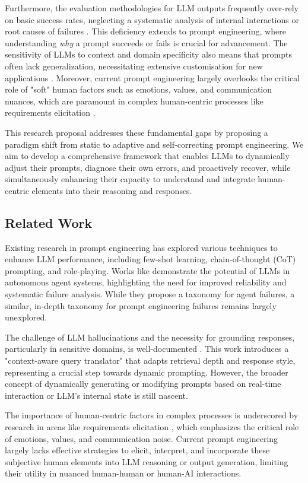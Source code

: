 \documentclass{article}
\begin{document}
Furthermore, the evaluation methodologies for LLM outputs frequently over-rely on basic success rates, neglecting a systematic analysis of internal interactions or root causes of failures \cite{paper1_agents}. This deficiency extends to prompt engineering, where understanding \textit{why} a prompt succeeds or fails is crucial for advancement. The sensitivity of LLMs to context and domain specificity also means that prompts often lack generalization, necessitating extensive customisation for new applications \cite{paper5_legalrag}. Moreover, current prompt engineering largely overlooks the critical role of "soft" human factors such as emotions, values, and communication nuances, which are paramount in complex human-centric processes like requirements elicitation \cite{paper2_requirements}.

This research proposal addresses these fundamental gaps by proposing a paradigm shift from static to adaptive and self-correcting prompt engineering. We aim to develop a comprehensive framework that enables LLMs to dynamically adjust their prompts, diagnose their own errors, and proactively recover, while simultaneously enhancing their capacity to understand and integrate human-centric elements into their reasoning and responses.

\subsection{Related Work}
Existing research in prompt engineering has explored various techniques to enhance LLM performance, including few-shot learning, chain-of-thought (CoT) prompting, and role-playing. Works like \cite{paper1_agents} demonstrate the potential of LLMs in autonomous agent systems, highlighting the need for improved reliability and systematic failure analysis. While they propose a taxonomy for agent failures, a similar, in-depth taxonomy for prompt engineering failures remains largely unexplored.

The challenge of LLM hallucinations and the necessity for grounding responses, particularly in sensitive domains, is well-documented \cite{paper5_legalrag}. This work introduces a "context-aware query translator" that adapts retrieval depth and response style, representing a crucial step towards dynamic prompting. However, the broader concept of dynamically generating or modifying prompts based on real-time interaction or LLM's internal state is still nascent.

The importance of human-centric factors in complex processes is underscored by research in areas like requirements elicitation \cite{paper2_requirements}, which emphasizes the critical role of emotions, values, and communication noise. Current prompt engineering largely lacks effective strategies to elicit, interpret, and incorporate these subjective human elements into LLM reasoning or output generation, limiting their utility in nuanced human-human or human-AI interactions.
\end{document}
